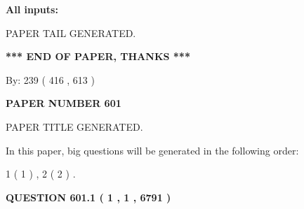 \documentclass[12pt]{article}
\begin{document}
   
   
   
\noindent{}
   
   
   
   
\noindent\vspace{0.1in}\hspace{-0.08in} {\textbf{\Large{All inputs: }}}
   
   
   
   
   
   
 \vspace{0.2in}
 
   
   
\vspace{2.0in} PAPER TAIL GENERATED.
   
   
   
   
\vspace{1.0in} 
{\textbf{\large{ *** END OF PAPER, THANKS *** }}} 
   
   
\hspace{1.0in} By: 
 239 ( 416 ,  613 )
   
   
   
   
\newpage 
\setcounter{page}{ 
   601001 } 
   
   
   
   
 {\textbf{ \Large{ PAPER NUMBER  601  }}}
   
   
\vspace{0.2in}
   
   
   
   
   
   
   
   
 \vspace{0.2in}
 
 
 
 
   
   
 PAPER TITLE GENERATED.
   
   
   
\vspace{0.2in}
   
In this paper, big questions will be generated in the following order: 
   
   
   1 ( 1 )
 ,
   2 ( 2 )
 .
  
\vspace{0.2in}
  
{\textbf{\Large{QUESTION
601.1 
 ( 1 , 1 , 6791 )
}}}
  
\end{document}
